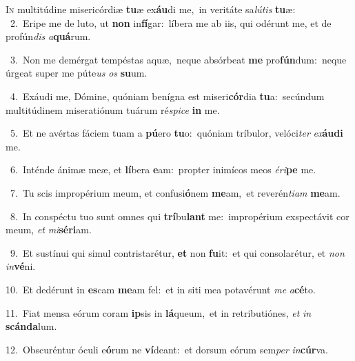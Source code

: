 \lettrine{\initial\textcolor{\initialcolor}{I}}{n} multitúdine misericórdiæ \textbf{tu}\-æ ex\-\textbf{áu}\-di me,~\star in veritáte sa\-\textit{lú}\-\textit{tis} \textbf{tu}\-æ:\\
{\numbfont\textcolor{\numbcolor}{~2.}}~Eripe me de luto, ut \textbf{non} in\-\textbf{fí}\-gar:~\star líbera me ab iis, qui odérunt me, et de profún\textit{dis} \textit{a}\-\textbf{quá}rum.\par
{\numbfont\textcolor{\numbcolor}{~3.}}~Non me demérgat tempéstas aquæ,~\dagger neque absórbeat \textbf{me} pro\-\textbf{fún}\-dum:~\star neque úrgeat super me púte\textit{us} \textit{os} \textbf{su}\-um.\par
{\numbfont\textcolor{\numbcolor}{~4.}}~Exáudi me, Dómine, quóniam benígna est miseri\-\textbf{cór}\-dia \textbf{tu}\-a:~\star secúndum multitúdinem miseratiónum tuárum ré\-\textit{spi}\-\textit{ce} \textbf{in} me.\par
{\numbfont\textcolor{\numbcolor}{~5.}}~Et ne avértas fáciem tuam a \textbf{pú}\-ero \textbf{tu}\-o:~\star quóniam tríbulor, velóci\textit{ter} \textit{ex}\-\textbf{áu}\textbf{di} me.\par
{\numbfont\textcolor{\numbcolor}{~6.}}~Inténde ánimæ meæ, et \textbf{lí}\-bera \textbf{e}\-am:~\star propter inimícos meos \textit{é}\-\textit{ri}\textbf{pe} me.\par
{\numbfont\textcolor{\numbcolor}{~7.}}~Tu scis impropérium meum, et confusi\-\textbf{ó}\-nem \textbf{me}\-am,~\star et reverén\-\textit{ti}\-\textit{am} \textbf{me}\-am.\par
{\numbfont\textcolor{\numbcolor}{~8.}}~In conspéctu tuo sunt omnes qui \textbf{trí}\-bu\textbf{lant} me:~\star impropérium exspectávit cor meum, \textit{et} \textit{mi}\-\textbf{sé}\textbf{ri}am.\par
{\numbfont\textcolor{\numbcolor}{~9.}}~Et sustínui qui simul contristarétur, \textbf{et} non \textbf{fu}\-it:~\star et qui consolarétur, et \textit{non} \textit{in}\-\textbf{vé}ni.\par
{\numbfont\textcolor{\numbcolor}{10.}}~Et dedérunt in \textbf{es}\-cam \textbf{me}\-am fel:~\star et in siti mea potavérunt \textit{me} \textit{a}\-\textbf{cé}to.\par
{\numbfont\textcolor{\numbcolor}{11.}}~Fiat mensa eórum coram \textbf{ip}\-sis in \textbf{lá}\-queum,~\star et in retributiónes, \textit{et} \textit{in} \textbf{scán}\-\textbf{da}lum.\par
{\numbfont\textcolor{\numbcolor}{12.}}~Obscuréntur óculi e\-\textbf{ó}\-rum ne \textbf{ví}\-deant:~\star et dorsum eórum sem\textit{per} \textit{in}\-\textbf{cúr}va.\par
